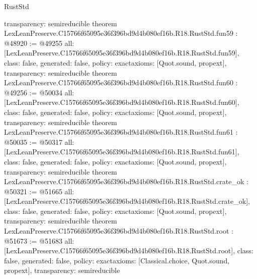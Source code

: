 \begin{lexlean}{RustStd}
\begin{coremodule}
{  transparency: semireducible
}
theorem LexLeanPreserve.C15766f65095e36f396bd9d4b080ef16b.R18.RustStd.fun59 : @48920 := @49255 {
  all: [LexLeanPreserve.C15766f65095e36f396bd9d4b080ef16b.R18.RustStd.fun59],
  class: false,
  generated: false,
  policy: exact{axioms: [Quot.sound, propext]},
  transparency: semireducible
}
theorem LexLeanPreserve.C15766f65095e36f396bd9d4b080ef16b.R18.RustStd.fun60 : @49256 := @50034 {
  all: [LexLeanPreserve.C15766f65095e36f396bd9d4b080ef16b.R18.RustStd.fun60],
  class: false,
  generated: false,
  policy: exact{axioms: [Quot.sound, propext]},
  transparency: semireducible
}
theorem LexLeanPreserve.C15766f65095e36f396bd9d4b080ef16b.R18.RustStd.fun61 : @50035 := @50317 {
  all: [LexLeanPreserve.C15766f65095e36f396bd9d4b080ef16b.R18.RustStd.fun61],
  class: false,
  generated: false,
  policy: exact{axioms: [Quot.sound, propext]},
  transparency: semireducible
}
theorem LexLeanPreserve.C15766f65095e36f396bd9d4b080ef16b.R18.RustStd.crate_ok : @50321 := @51665 {
  all: [LexLeanPreserve.C15766f65095e36f396bd9d4b080ef16b.R18.RustStd.crate_ok],
  class: false,
  generated: false,
  policy: exact{axioms: [Quot.sound, propext]},
  transparency: semireducible
}
theorem LexLeanPreserve.C15766f65095e36f396bd9d4b080ef16b.R18.RustStd.root : @51673 := @51683 {
  all: [LexLeanPreserve.C15766f65095e36f396bd9d4b080ef16b.R18.RustStd.root],
  class: false,
  generated: false,
  policy: exact{axioms: [Classical.choice, Quot.sound, propext]},
  transparency: semireducible
}


\end{coremodule}
\end{lexlean}

